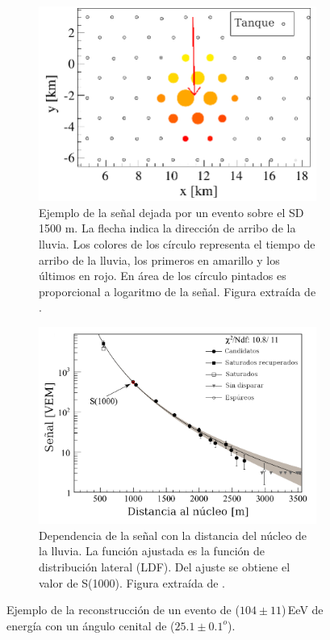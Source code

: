 \begin{figure}[H]
    \begin{subfigure}[t]{0.51\textwidth}
	\includegraphics[width=\textwidth]{evento_sd.png}
	\caption{Ejemplo de la señal dejada por un evento sobre el SD 1500 m. La flecha indica la dirección de arribo de la lluvia. Los colores de los círculo representa el tiempo de arribo de la lluvia, los primeros en amarillo y los últimos en rojo. En área de los círculo pintados es proporcional a logaritmo de la señal. Figura extraída de \cite{como_funciona_auger}. } 	\label{fig:evento_sd}
    \end{subfigure}%
    \hspace{\fill}
    \begin{subfigure}[t]{0.45\textwidth}
	\includegraphics[width=\textwidth]{evento_s1000.png}
	\caption{Dependencia de la señal con la distancia del núcleo de la lluvia. La función ajustada es la función de distribución lateral (LDF). Del ajuste se obtiene el valor de S(1000). Figura extraída de \cite{como_funciona_auger}. } 	\label{fig:evento_S1000}
    \end{subfigure}%
    \caption{Ejemplo de la reconstrucción de un evento de ($104\pm11$)\,EeV de energía con un ángulo cenital de ($25.1\pm0.1 ^o$).}
	\end{figure}


